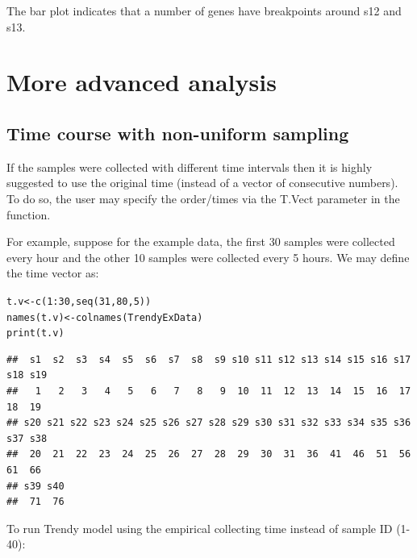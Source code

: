 \documentclass{article}\usepackage[]{graphicx}\usepackage[usenames,dvipsnames]{color}
\newcommand{\hlnum}[1]{\textcolor[rgb]{0.816,0.125,0.439}{#1}}%
\newcommand{\hlopt}[1]{\textcolor[rgb]{0,0,0}{#1}}%
\newcommand{\hlstd}[1]{\textcolor[rgb]{0.251,0.251,0.251}{#1}}%
\newcommand{\hlkwb}[1]{\textcolor[rgb]{0,0,0}{#1}}%
\newcommand{\hlkwd}[1]{\textcolor[rgb]{0.878,0.439,0.125}{#1}}%
\newenvironment{knitrout}{}{} %
\begin{document}
The bar plot indicates that a number of genes have breakpoints around s12 and s13.

\section{More advanced analysis}

\subsection{Time course with non-uniform sampling}
If the samples were collected with different time intervals then it is highly suggested to
use the original time (instead of a vector of consecutive numbers). To do so,
the user may specify the order/times via the T.Vect parameter in the  function.

For example, suppose for the example data, the first 30 samples were collected
every hour and the other 10 samples were collected every 5 hours. We may define
the time vector as:
\begin{knitrout}
\color{fgcolor}\begin{kframe}
\begin{alltt}
\hlstd{t.v} \hlkwb{<-} \hlkwd{c}\hlstd{(}\hlnum{1}\hlopt{:}\hlnum{30}\hlstd{,} \hlkwd{seq}\hlstd{(}\hlnum{31}\hlstd{,} \hlnum{80}\hlstd{,} \hlnum{5}\hlstd{))}
\hlkwd{names}\hlstd{(t.v)} \hlkwb{<-} \hlkwd{colnames}\hlstd{(TrendyExData)}
\hlkwd{print}\hlstd{(t.v)}
\end{alltt}
\begin{verbatim}
##  s1  s2  s3  s4  s5  s6  s7  s8  s9 s10 s11 s12 s13 s14 s15 s16 s17 s18 s19 
##   1   2   3   4   5   6   7   8   9  10  11  12  13  14  15  16  17  18  19 
## s20 s21 s22 s23 s24 s25 s26 s27 s28 s29 s30 s31 s32 s33 s34 s35 s36 s37 s38 
##  20  21  22  23  24  25  26  27  28  29  30  31  36  41  46  51  56  61  66 
## s39 s40 
##  71  76
\end{verbatim}
\end{kframe}
\end{knitrout}

To run Trendy model using the empirical collecting time instead of sample ID (1-40):
\end{document}
